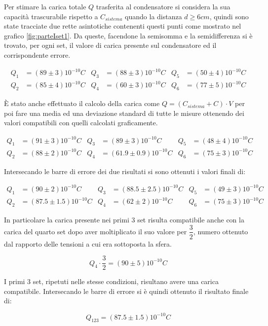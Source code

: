 {Per stimare la carica totale $Q$ trasferita al condensatore si considera la sua capacità trascurabile rispetto a $C_{sistema}$ quando la distanza $d \geq 6 cm$, quindi sono state tracciate due rette asintotiche contenenti questi punti come mostrato nel grafico \ref{fig:parteIset1}. Da queste, facendone la semisomma e la semidifferenza si è trovato, per ogni set, il valore di carica presente sul condensatore ed il corrispondente errore.

\begin{align*}
    Q_1 &= (89 \pm 3) 10^{-10} C    &   Q_3 &= (88 \pm 3) 10^{-10} C    &    Q_5 &= (50 \pm 4) 10^{-10} C\\
    Q_2 &= (85 \pm 4) 10^{-10} C    &   Q_4 &= (60 \pm 3) 10^{-10} C    &    Q_6 &= (77 \pm 5) 10^{-10} C
\end{align*}

È stato anche effettuato il calcolo della carica come $Q = (C_{sistema} + C) \cdot V$ per poi fare una media ed una deviazione standard di tutte le misure ottenendo dei valori compatibili con quelli calcolati graficamente.

\begin{align*}
    Q_1 &= (91 \pm 3) 10^{-10} C    &   Q_3 &= (89 \pm 3) 10^{-10} C    &    Q_5 &= (48 \pm 4) 10^{-10} C\\
    Q_2 &= (88 \pm 2) 10^{-10} C    &   Q_4 &= (61.9 \pm 0.9) 10^{-10} C    &    Q_6 &= (75 \pm 3) 10^{-10} C
\end{align*}

Intersecando le barre di errore dei due risultati si sono ottenuti i valori finali di:

\begin{align*}
    Q_1 &= (90 \pm 2) 10^{-10} C    &   Q_3 &= (88.5 \pm 2.5) 10^{-10} C    &    Q_5 &= (49 \pm 3) 10^{-10} C\\
    Q_2 &= (87.5 \pm 1.5) 10^{-10} C    &   Q_4 &= (62 \pm 2) 10^{-10} C    &    Q_6 &= (75 \pm 3) 10^{-10} C
\end{align*}

In particolare la carica presente nei primi 3 set risulta compatibile anche con la carica del quarto set dopo aver moltiplicato il suo valore per $\dfrac{3}{2}$, numero ottenuto dal rapporto delle tensioni a cui era sottoposta la sfera.

\begin{equation*}
    Q_4 \cdot \dfrac{3}{2} = (90 \pm 5) 10^{-10} C 
\end{equation*}

I primi 3 set, ripetuti nelle stesse condizioni, risultano avere una carica compatibile. Intersecando le barre di errore si è quindi ottenuto il risultato finale di:

\begin{equation*}
    Q_{123} = (87.5 \pm 1.5) 10^{-10} C 
\end{equation*}
\par}